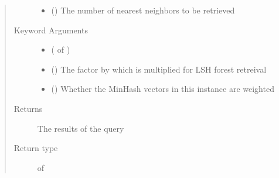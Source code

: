 \documentclass[letterpaper,10pt,english]{sphinxmanual}
\begin{document}
\begin{fulllineitems}
\begin{fulllineitems}
\begin{quote}
\begin{description}
\begin{itemize}
\item {} 
 () \textendash{} The number of nearest neighbors to be retrieved

\end{itemize}

\item[{Keyword Arguments}] \leavevmode\begin{itemize}
\item {} 
 ( of ) \textendash{} 

\item {} 
 () \textendash{} The factor by which  is multiplied for LSH forest retreival

\item {} 
 () \textendash{} Whether the MinHash vectors in this {\hyperref[\detokenize{documentation:tmap.LSHForest}]{}} instance are weighted

\end{itemize}

\item[{Returns}] \leavevmode
The results of the query

\item[{Return type}] \leavevmode
{} of 

\end{description}\end{quote}

\end{fulllineitems}



\end{fulllineitems}
\end{document}
